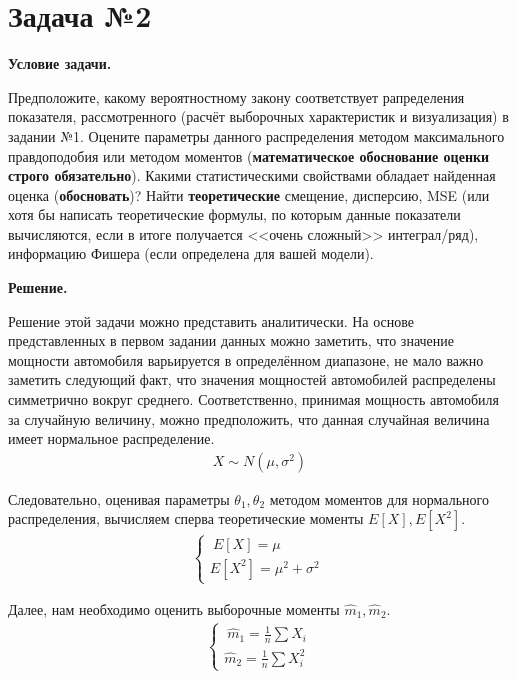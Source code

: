 \documentclass[12pt]{article}
\begin{document}
\vspace{1em}

\section*{Задача №2}

\textbf{Условие задачи.}

Предположите, какому вероятностному закону соответствует рапределения показателя, рассмотренного (расчёт выборочных характеристик и визуализация) в задании №1. Оцените параметры данного распределения методом максимального правдоподобия или методом моментов (\textbf{математическое обоснование оценки строго обязательно}). Какими статистическими свойствами обладает найденная оценка (\textbf{обосновать})? Найти \textbf{теоретические} смещение, дисперсию, MSE (или хотя бы написать теоретические формулы, по которым данные показатели вычисляются, если в итоге получается <<очень сложный>> интеграл/ряд), информацию Фишера (если определена для вашей модели).

\vspace{1em}

\textbf{Решение.}

Решение этой задачи можно представить аналитически. На основе представленных в первом задании данных можно заметить, что значение мощности автомобиля варьируется в определённом диапазоне, не мало важно заметить следующий факт, что значения мощностей автомобилей распределены симметрично вокруг среднего. Соответственно, принимая мощность автомобиля за случайную величину, можно предположить, что данная случайная величина имеет нормальное распределение. 
\begin{gather}
    \label{LawOfNormalDistribution}
    \ X \sim N(\mu, \sigma^2)\
\end{gather}

Следовательно, оценивая параметры $\theta_1, \theta_2$ методом моментов для нормального распределения, вычисляем сперва теоретические моменты $E[X], E[X^2]$. \\
\begin{gather*}
    \begin{cases}
    \ E[X] = \mu \\
    E[X^2] = \mu^2 + \sigma^2\
    \end{cases}
    \label{TheoreticalMoments}
\end{gather*}

Далее, нам необходимо оценить выборочные моменты $ \hat{m}_1, \hat{m}_2 $.
\begin{gather*}
    \begin{cases}
    \ \hat{m}_1 = \frac{1}{n} \sum X_i \\
    \hat{m}_2 = \frac{1}{n} \sum X_i^2\
    \end{cases}
    \label{SelectiveMoments}
\end{gather*}
\end{document}
